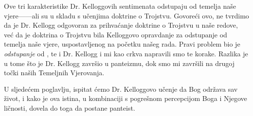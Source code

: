 Ove tri karakteristike Dr. Kelloggovih sentimenata odstupaju od temelja naše vjere——ali su u skladu s učenjima doktrine o Trojstvu. Govoreći ovo, ne tvrdimo da je Dr. Kellogg odgovoran za prihvaćanje doktrine o Trojstvu u naše redove, već da je doktrina o Trojstvu bila Kelloggovo opravdanje za odstupanje od temelja naše vjere, uspostavljenog na početku našeg rada. Pravi problem bio je \textit{odstupanje} od , te i Dr. Kellogg i mi kao crkva napravili smo te korake. Razlika je u tome što je Dr. Kellogg završio u panteizmu, dok smo mi završili na drugoj točki naših Temeljnih Vjerovanja.

U sljedećem poglavlju, ispitat ćemo Dr. Kelloggovo učenje da Bog održava sav život, i kako je ova istina, u kombinaciji s pogrešnom percepcijom Boga i Njegove ličnosti, dovela do toga da postane panteist.
